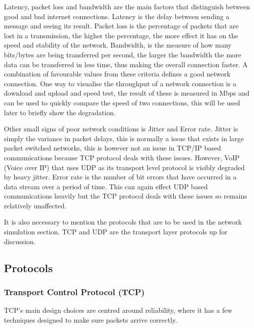 Latency, packet loss and bandwidth are the main factors that distinguish between good and bad internet connections. Latency is the delay between sending a message and seeing its result. Packet loss is the percentage of packets that are lost in a transmission, the higher the percentage, the more effect it has on the speed and stability of the network. Bandwidth, is the measure of how many bits/bytes are being transferred per second, the larger the bandwidth the more data can be transferred in less time, thus making the overall connection faster. A combination of favourable values from these criteria defines a good network connection. One way to visualise the throughput of a network connection is a download and upload and speed test, the result of these is measured in Mbps and can be used to quickly compare the speed of two connections, this will be used later to briefly show the degradation.

Other small signs of poor network conditions is Jitter and Error rate. Jitter is simply the variance in packet delays, this is normally a issue that exists in large packet switched networks, this is however not an issue in TCP/IP based communications because TCP protocol deals with these issues. However, VoIP (Voice over IP) that uses UDP as its transport level protocol is visibly degraded by heavy jitter. Error rate is the number of bit errors that have occurred in a data stream over a period of time. This can again effect UDP based communications heavily but the TCP protocol deals with these issues so remains relatively unaffected.

It is also necessary to mention the protocols that are to be used in the network simulation section. TCP \citep{TCP} and UDP \citep{UDP} are the transport layer protocols up for discussion. 


\subsection{Protocols}
\subsubsection{Transport Control Protocol (TCP)}
TCP's main design choices are centred around reliability, where it has a few techniques designed to make sure packets arrive correctly. 

